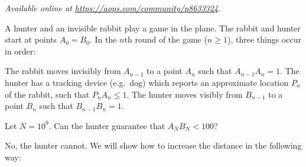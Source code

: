 \textsl{Available online at \url{https://aops.com/community/p8633324}.}
\begin{mdframed}[style=mdpurplebox,frametitle={Problem statement}]
A hunter and an invisible rabbit play a game in the plane.
The rabbit and hunter start at points $A_0 = B_0$.
In the $n$th round of the game ($n \ge 1$), three things occur in order:
\begin{enumerate}[(i)]
  \ii The rabbit moves invisibly from $A_{n-1}$ to a point $A_n$
  such that $A_{n-1} A_n = 1$.
  \ii The hunter has a tracking device (e.g.\ dog)
  which reports an approximate location $P_n$ of the rabbit,
  such that $P_n A_n \le 1$.
  \ii The hunter moves visibly from $B_{n-1}$ to a point $B_n$
  such that $B_{n-1} B_n = 1$.
\end{enumerate}
Let $N = 10^9$. Can the hunter guarantee that $A_N B_N < 100$?
\end{mdframed}
No, the hunter cannot.
We will show how to increase the distance in the following way:

